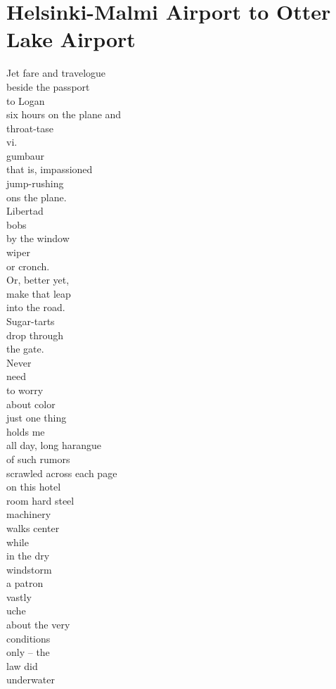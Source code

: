\documentclass[smalldemyvopaper,11pt,twoside,onecolumn,openright,extrafontsizes]{memoir}
\newlength\drop
\begin{document}
\chapter{Helsinki-Malmi Airport to Otter Lake Airport}
Jet fare and travelogue
\\beside the passport
\\to Logan
\\six hours on the plane and
\\throat-tase
\\vi.
\\gumbaur
\\that is, impassioned
\\jump-rushing
\\ons the plane.
\\Libertad
\\bobs
\\by the window
\\wiper
\\or cronch.
\\Or, better yet,
\\make that leap
\\into the road.
\\Sugar-tarts
\\drop through
\\the gate.
\\Never
\\need
\\to worry
\\about color
\\just one thing
\\holds me
\\all day, long harangue
\\of such rumors
\\scrawled across each page
\\on this hotel
\\room hard steel
\\machinery
\\walks center
\\while
\\in the dry
\\windstorm
\\a patron
\\vastly
\\uche
\\about the very
\\conditions
\\only -- the
\\law did
\\underwater
\end{document}
